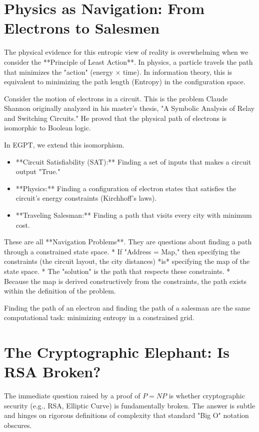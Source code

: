 \documentclass{report}
\begin{document}
\section{Physics as Navigation: From Electrons to Salesmen}

The physical evidence for this entropic view of reality is overwhelming when we consider the **Principle of Least Action**. In physics, a particle travels the path that minimizes the "action" (energy $\times$ time). In information theory, this is equivalent to minimizing the path length (Entropy) in the configuration space.

Consider the motion of electrons in a circuit. This is the problem Claude Shannon originally analyzed in his master's thesis, "A Symbolic Analysis of Relay and Switching Circuits." He proved that the physical path of electrons is isomorphic to Boolean logic.

In EGPT, we extend this isomorphism.
\begin{itemize}
    \item **Circuit Satisfiability (SAT):** Finding a set of inputs that makes a circuit output "True."
    \item **Physics:** Finding a configuration of electron states that satisfies the circuit's energy constraints (Kirchhoff's laws).
    \item **Traveling Salesman:** Finding a path that visits every city with minimum cost.
\end{itemize}

These are all **Navigation Problems**. They are questions about finding a path through a constrained state space.
* If "Address = Map," then specifying the constraints (the circuit layout, the city distances) *is* specifying the map of the state space.
* The "solution" is the path that respects these constraints.
* Because the map is derived constructively from the constraints, the path exists within the definition of the problem.

Finding the path of an electron and finding the path of a salesman are the same computational task: minimizing entropy in a constrained grid.

\section{The Cryptographic Elephant: Is RSA Broken?}

The immediate question raised by a proof of $P=NP$ is whether cryptographic security (e.g., RSA, Elliptic Curve) is fundamentally broken. The answer is subtle and hinges on rigorous definitions of complexity that standard "Big O" notation obscures.
\end{document}
